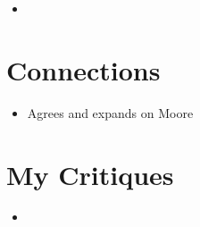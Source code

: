 \documentclass[12pt]{article}
\begin{document}
\begin{itemize}[leftmargin=*, itemsep=4pt]
    \item
\end{itemize}


\section{Connections}

\begin{itemize}[leftmargin=*, itemsep=4pt]
    \item Agrees and expands on Moore
\end{itemize}


\section{My Critiques}

\begin{itemize}[leftmargin=*, itemsep=4pt]
    \item
\end{itemize}
\end{document}
